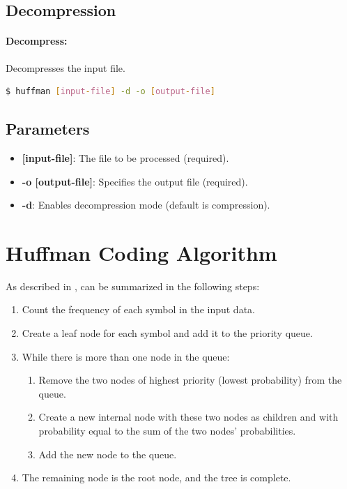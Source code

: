 \documentclass{article}
\begin{document}
\subsection{Decompression}

\paragraph{Decompress:} Decompresses the input file.
\begin{lstlisting}[language=bash]
$ huffman [input-file] -d -o [output-file]
\end{lstlisting}

\subsection{Parameters}
\begin{itemize}
    \item \textbf{[input-file]}: The file to be processed (required).
    \item \textbf{-o [output-file]}: Specifies the output file (required).
    \item \textbf{-d}: Enables decompression mode (default is compression).
\end{itemize}

\section{Huffman Coding Algorithm}

As described in \cite{wikihuffman}, can be summarized in the following steps:

\begin{enumerate}
    \item Count the frequency of each symbol in the input data.
    \item Create a leaf node for each symbol and add it to the priority queue.
    \item While there is more than one node in the queue:
        \begin{enumerate}
            \item Remove the two nodes of highest priority (lowest probability) from the queue.
            \item Create a new internal node with these two nodes as children and with probability equal to the sum of the two nodes' probabilities.
            \item Add the new node to the queue.
        \end{enumerate}
    \item The remaining node is the root node, and the tree is complete.
\end{enumerate}
\end{document}
